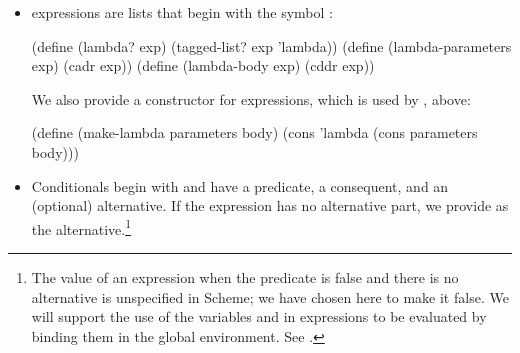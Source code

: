 \begin{itemize}
\noindent
or the form

\begin{codeBlock}
(define (~\(\langle \)~~~~\(\rangle \)~ ~\(\langle \)~~~~\(_{\mono{1}}\rangle \)~ ~\( \dots \)~ ~\(\langle \)~~~~\(_{\monoItalic{n}}\rangle \)~)
  ~\(\langle \)~~~~\(\rangle \)~)
\end{codeBlock}

The latter form (standard procedure definition) is syntactic sugar for

\begin{codeBlock}
(define ~\(\langle \)~~~~\(\rangle \)~
  (lambda (~\(\langle \)~~~~\(_{\mono{1}}\rangle \)~ ~\( \dots \)~ ~\(\langle \)~~~~\(_{\monoItalic{n}}\rangle \)~)
    ~\(\langle \)~~~~\(\rangle \)~))
\end{codeBlock}

The corresponding syntax procedures are the following:

\begin{codeBlock}
(define (definition? exp) (tagged-list? exp
                                        'define))
(define (definition-variable exp)
  (if (symbol? (cadr exp))
      (cadr exp)
      (caadr exp)))
(define (definition-value exp)
  (if (symbol? (cadr exp))
      (caddr exp)
      (make-lambda (cdadr exp)     ~\textrm{; formal parameters}~
                   (cddr exp))))   ~\textrm{; body}~
\end{codeBlock}

\item
{} expressions are lists that begin with the symbol :

\begin{codeBlock}
(define (lambda? exp) (tagged-list? exp 'lambda))
(define (lambda-parameters exp) (cadr exp))
(define (lambda-body exp) (cddr exp))
\end{codeBlock}

We also provide a constructor for  expressions, which is used by
, above:

\begin{codeBlock}
(define (make-lambda parameters body)
  (cons 'lambda (cons parameters body)))
\end{codeBlock}

\item
Conditionals begin with  and have a predicate, a consequent, and an
(optional) alternative.  If the expression has no alternative part, we provide
 as the alternative.\footnote{The value of an  expression
when the predicate is false and there is no alternative is unspecified in
Scheme; we have chosen here to make it false.  We will support the use of the
variables  and  in expressions to be evaluated by
binding them in the global environment.  See .}


\end{itemize}
